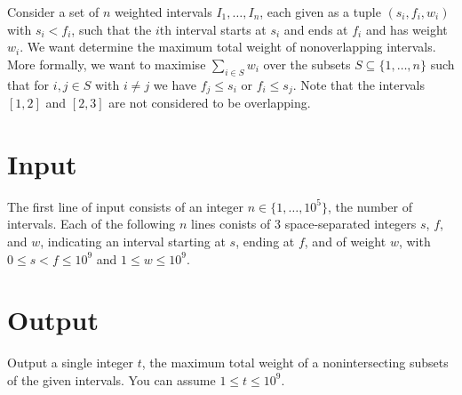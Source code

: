 

Consider a set of $n$ weighted intervals $I_1,\ldots, I_n$, each given as a tuple $(s_i, f_i, w_i)$ with $s_i<f_i$, such that the $i$th interval starts at $s_i$ and ends at $f_i$ and has weight $w_i$.
We want determine the maximum total weight of nonoverlapping intervals.
More formally, we want to maximise $\sum_{i\in S} w_i$ over the subsets $S\subseteq \{1,\ldots,n\}$ such that for $i, j\in S$ with $i\neq j$ we have $f_j \leq s_i$ or $f_i\leq s_j$. 
Note that the intervals $[1,2]$ and $[2,3]$ are not considered to be overlapping.

\section*{Input}

The first line of input consists of an integer $n\in\{1,\ldots, 10^5\}$, the number of intervals.
Each of the following $n$ lines conists of 3 space-separated integers $s$, $f$, and $w$, indicating an interval starting at $s$, ending at $f$, and of weight $w$, with $0\leq s<f\leq 10^9$ and $1\leq w\leq 10^9$.


\section*{Output}

Output a single integer $t$, the maximum total weight of a nonintersecting subsets of the given intervals.
You can assume  $1\leq t\leq 10^9$.
